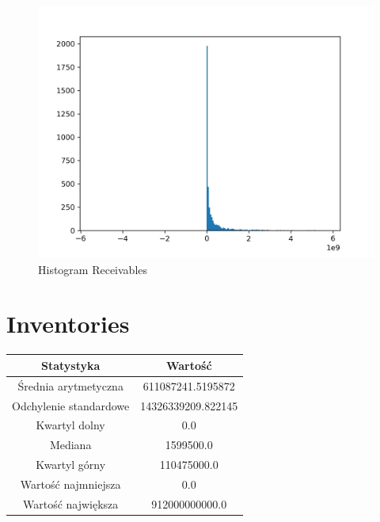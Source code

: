 \documentclass{article}
\begin{document}
\begin{figure}[h!]
    \includegraphics[width=\linewidth]{variables/Receivables.png}
    \caption{Histogram Receivables }
\end{figure}\section{ Inventories }

\begin{center}
    \begin{tabular}{|c | c|} 
    \hline
    Statystyka & Wartość \\
    \hline\hline
    Średnia arytmetyczna & 611087241.5195872 \\ 
    \hline
    Odchylenie standardowe & 14326339209.822145 \\
    \hline
    Kwartyl dolny & 0.0 \\
    \hline
    Mediana & 1599500.0 \\
    \hline
    Kwartyl górny & 110475000.0 \\
    \hline
    Wartość najmniejsza & 0.0 \\
    \hline
    Wartość największa & 912000000000.0 \\
    \hline
   \end{tabular}
\end{center}
\end{document}
